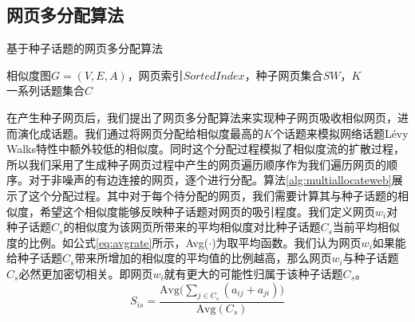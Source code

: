 \subsection{网页多分配算法}

\begin{algorithm}[!htbp]
    \caption{基于种子话题的网页多分配算法}\label{alg:multiallocateweb}
    \hspace*{0.02in}{\bf Input:}
    相似度图$G=(V,E,A)$，网页索引$SortedIndex$，种子网页集合$SW$，$K$\\
    \hspace*{0.02in}{\bf Output:}
    一系列话题集合$C$
\end{algorithm}

在产生种子网页后，我们提出了网页多分配算法来实现种子网页吸收相似网页，进而演化成话题。我们通过将网页分配给相似度最高的$K$个话题来模拟网络话题L\'evy Walks特性中额外较低的相似度。同时这个分配过程模拟了相似度流的扩散过程，所以我们采用了生成种子网页过程中产生的网页遍历顺序作为我们遍历网页的顺序。对于非噪声的有边连接的网页，逐个进行分配。算法\ref{alg:multiallocateweb}展示了这个分配过程。其中对于每个待分配的网页，我们需要计算其与种子话题的相似度，希望这个相似度能够反映种子话题对网页的吸引程度。我们定义网页$w_i$对种子话题$C_s$的相似度为该网页所带来的平均相似度对比种子话题$C_s$当前平均相似度的比例。如公式\ref{eq:avgrate}所示，Avg($\cdot$)为取平均函数。我们认为网页$w_i$如果能给种子话题$C_s$带来所增加的相似度的平均值的比例越高，那么网页$w_i$与种子话题$C_s$必然更加密切相关。即网页$w_i$就有更大的可能性归属于该种子话题$C_s$。
\begin{equation}\label{eq:avgrate}
  S_{is} = \frac{\text{Avg}\big(\sum_{j\in C_s}(a_{ij}+a_{ji})\big)}{\text{Avg}(C_s)}
\end{equation}

